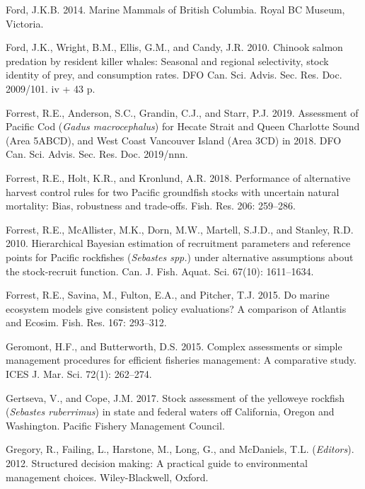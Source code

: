 \documentclass[11pt]{book}
\begin{document}
\leavevmode\hypertarget{ref-ford2014}{}%
Ford, J.K.B. 2014. Marine Mammals of British Columbia. Royal BC Museum, Victoria.

\leavevmode\hypertarget{ref-ford2010}{}%
Ford, J.K., Wright, B.M., Ellis, G.M., and Candy, J.R. 2010. Chinook salmon predation by resident killer whales: Seasonal and regional selectivity, stock identity of prey, and consumption rates. DFO Can. Sci. Advis. Sec. Res. Doc. 2009/101. iv + 43 p.

\leavevmode\hypertarget{ref-forrest2019}{}%
Forrest, R.E., Anderson, S.C., Grandin, C.J., and Starr, P.J. 2019. Assessment of Pacific Cod (\emph{Gadus macrocephalus}) for Hecate Strait and Queen Charlotte Sound (Area 5ABCD), and West Coast Vancouver Island (Area 3CD) in 2018. DFO Can. Sci. Advis. Sec. Res. Doc. 2019/nnn.

\leavevmode\hypertarget{ref-forrest2018}{}%
Forrest, R.E., Holt, K.R., and Kronlund, A.R. 2018. Performance of alternative harvest control rules for two Pacific groundfish stocks with uncertain natural mortality: Bias, robustness and trade-offs. Fish. Res. 206: 259--286.

\leavevmode\hypertarget{ref-forrest2010}{}%
Forrest, R.E., McAllister, M.K., Dorn, M.W., Martell, S.J.D., and Stanley, R.D. 2010. Hierarchical Bayesian estimation of recruitment parameters and reference points for Pacific rockfishes (\emph{Sebastes spp.}) under alternative assumptions about the stock-recruit function. Can. J. Fish. Aquat. Sci. 67(10): 1611--1634.

\leavevmode\hypertarget{ref-forrest2015}{}%
Forrest, R.E., Savina, M., Fulton, E.A., and Pitcher, T.J. 2015. Do marine ecosystem models give consistent policy evaluations? A comparison of Atlantis and Ecosim. Fish. Res. 167: 293--312.

\leavevmode\hypertarget{ref-geromont2015}{}%
Geromont, H.F., and Butterworth, D.S. 2015. Complex assessments or simple management procedures for efficient fisheries management: A comparative study. ICES J. Mar. Sci. 72(1): 262--274.

\leavevmode\hypertarget{ref-gertseva2017}{}%
Gertseva, V., and Cope, J.M. 2017. Stock assessment of the yelloweye rockfish (\emph{Sebastes ruberrimus}) in state and federal waters off California, Oregon and Washington. Pacific Fishery Management Council.

\leavevmode\hypertarget{ref-gregory2012}{}%
Gregory, R., Failing, L., Harstone, M., Long, G., and McDaniels, T.L. (\emph{Editors}). 2012. Structured decision making: A practical guide to environmental management choices. Wiley-Blackwell, Oxford.
\end{document}
